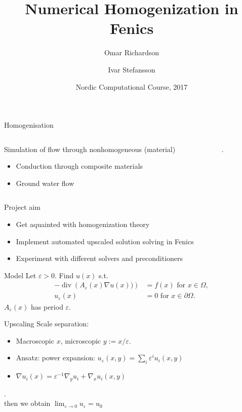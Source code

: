 \documentclass{beamer}
\title[Numerical homogenization]{Numerical Homogenization in Fenics}
\author[O. Richardson \and I. Stefansson] %
{Omar Richardson \and Ivar Stefansson}
\institute %
{
    Karlstad University, Sweden \and University of Bergen, Norway
}
\date[]{Nordic Computational Course, 2017}
\renewcommand{\div}[1]{\operatorname{div}\left( #1 \right)}
\begin{document}
  \frame{\titlepage}
\begin{frame}{Homogenisation}
    \begin{columns}
        \begin{column}[c]{.5\textwidth}
            Simulation of flow through nonhomogeneous (material)
            \begin{itemize}
              \item Conduction through composite materials
              \item Ground water flow
            \end{itemize}
        \end{column}
        \begin{column}[c]{.5\textwidth}
            .
        \end{column}
    \end{columns}
\end{frame}

\begin{frame}[t]{Project aim}
    \begin{itemize}
        \item Get aquainted with homogenization theory
        \item Implement automated upscaled solution solving in Fenics
        \item Experiment with different solvers and preconditioners
    \end{itemize}
\end{frame}

\begin{frame}[t]{Model}
    Let $\varepsilon>0$. Find $u(x)$ s.t.
    \begin{equation}
        \begin{split}
            -\div{A_\varepsilon(x)\nabla u(x))} &= f(x) \mbox{ for } x \in \Omega,\\
            u_\varepsilon(x) &= 0 \mbox{ for } x \in \partial\Omega.
        \end{split}
        \label{eq:model}
    \end{equation}
     $A_\varepsilon(x)$ has period $\varepsilon$.

\end{frame}

\begin{frame}[t]{Upscaling}
    Scale separation: \begin{itemize}
        \item Macroscopic $x$, microscopic $y:= x/\varepsilon$.
        \item Ansatz: power expansion: $u_\varepsilon(x,y) = \sum_i \varepsilon^i u_i(x,y)$
        \item $\nabla u_i(x) = \varepsilon^{-1}\nabla_yu_i + \nabla_xu_i(x,y)$
    \end{itemize}
    .\\
    then we obtain $\lim_{\varepsilon\to 0} u_\varepsilon = u_0$
\end{frame}
\end{document}
